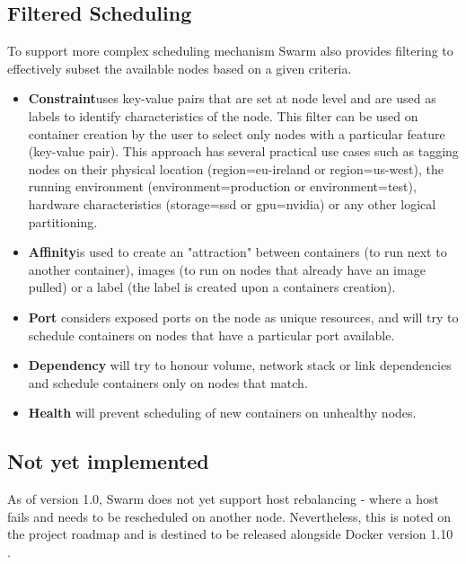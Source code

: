 \documentclass{article}
\begin{document}
\subsection{Filtered Scheduling}
To support more complex scheduling mechanism Swarm also provides filtering to effectively subset the available nodes based on a given criteria.
\begin{itemize}
\item \textbf{Constraint}\footnotemark[1] uses key-value pairs that are set at node level and are used as labels to identify characteristics of the node. This filter can be used on container creation by the user to select only nodes with a particular feature (key-value pair). This approach has several practical use cases such as tagging nodes on their physical location (region=eu-ireland or region=us-west), the running environment (environment=production or environment=test), hardware characteristics (storage=ssd or gpu=nvidia) or any other logical partitioning.
\item \textbf{Affinity}\footnotemark[1] is used to create an "attraction" between containers (to run next to another container), images (to run on nodes that already have an image pulled) or a label (the label is created upon a containers creation).
\item \textbf{Port} considers exposed ports on the node as unique resources, and will try to schedule containers on nodes that have a particular port available.
\item \textbf{Dependency} will try to honour volume, network stack or link dependencies and schedule containers only on nodes that match.
\item \textbf{Health} will prevent scheduling of new containers on unhealthy nodes.
\end{itemize}
\subsection{Not yet implemented}
As of version 1.0, Swarm does not yet support host rebalancing - where a host fails and needs to be rescheduled on another node. Nevertheless, this is noted on the project roadmap and is destined to be released alongside Docker version 1.10 \citep{Vieux}.
\end{document}
